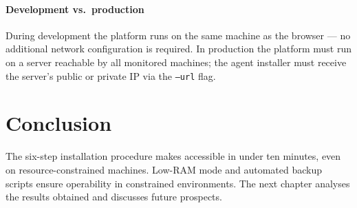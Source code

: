 \paragraph{Development vs.\ production}
During development the platform runs on the same machine as the browser — no
additional network configuration is required. In production the platform must
run on a server reachable by all monitored machines; the agent installer must
receive the server's public or private IP via the \texttt{--url} flag.

\section*{Conclusion}

The six-step installation procedure makes \caimp{} accessible in under ten minutes,
even on resource-constrained machines. Low-RAM mode and automated backup scripts
ensure operability in constrained environments. The next chapter analyses the
results obtained and discusses future prospects.
